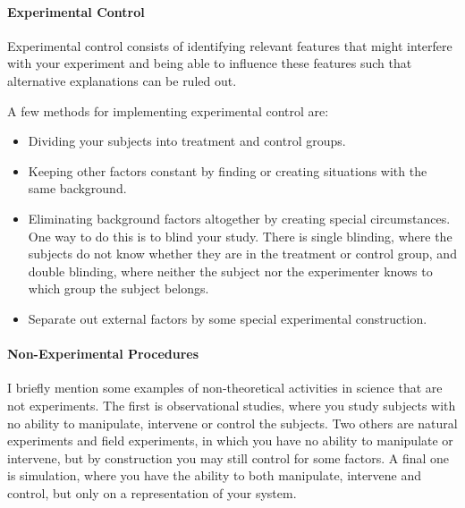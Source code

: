 \paragraph{Experimental Control}
Experimental control consists of identifying relevant features that might interfere with your experiment and being able to influence these features such that alternative explanations can be ruled out.

A few methods for implementing experimental control are:
\begin{itemize}
	\item Dividing your subjects into treatment and control groups.
	\item Keeping other factors constant by finding or creating situations with the same background.
	\item Eliminating background factors altogether by creating special circumstances. One way to do this is to blind your study. There is single blinding, where the subjects do not know whether they are in the treatment or control group, and double blinding, where neither the subject nor the experimenter knows to which group the subject belongs.
	\item Separate out external factors by some special experimental construction.
\end{itemize}

\paragraph{Non-Experimental Procedures}
I briefly mention some examples of non-theoretical activities in science that are not experiments. The first is observational studies, where you study subjects with no ability to manipulate, intervene or control the subjects. Two others are natural experiments and field experiments, in which you have no ability to manipulate or intervene, but by construction you may still control for some factors. A final one is simulation, where you have the ability to both manipulate, intervene and control, but only on a representation of your system.